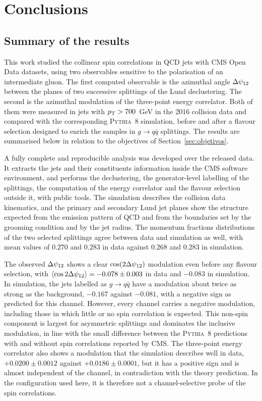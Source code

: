\chapter{Conclusions}
\label{cap:conclusoes}

\section{Summary of the results}
\label{sec:conc-summary}

This work studied the collinear spin correlations in QCD jets with CMS Open Data datasets, using 
two observables sensitive to the polarisation of an intermediate gluon. The first 
computed observable is the azimuthal angle $\Delta\psi_{12}$ between the planes of two
successive splittings of the Lund declustering. The second is the azimuthal
modulation of the three-point energy correlator. Both of them were measured 
in jets with $p_{\mathrm{T}} > 700$~GeV in the 2016 collision data and compared with the corresponding
\textsc{Pythia}~8 simulation, before and after a flavour selection designed to
enrich the samples in $g \to q\bar{q}$ splittings. The results are summarised below 
in relation to the objectives of Section~\ref{sec:objetivos}.

A fully complete and reproducible analysis was developed over the released data. It
extracts the jets and their constituents information inside the CMS software environment, and
performs the declustering, the generator-level labelling of the splittings, the
computation of the energy correlator and the flavour selection outside it, with
public tools. The simulation describes the collision data kinematics, and the primary and secondary Lund jet planes
show the structure expected from the emission pattern of QCD and from the
boundaries set by the grooming condition and by the jet radius. The momentum fractions 
distributions of the two selected splittings agree between data and simulation as well, 
with mean values of $0.270$ and $0.283$ in data
against $0.268$ and $0.283$ in simulation.

The observed $\Delta\psi_{12}$ shows a clear $\cos(2\Delta\psi_{12})$ modulation even before any flavour selection,
with $\langle \cos 2\Delta\psi_{12} \rangle = -0.078 \pm 0.003$ in data and
$-0.083$ in simulation. In simulation, the jets labelled as $g \to q\bar{q}$ have a
modulation about twice as strong as the background, $-0.167$ against $-0.081$,
with a negative sign as predicted for this channel. However, every channel carries a negative
modulation, including those in which little or no spin correlation is
expected. This non-spin component is largest for asymmetric splittings and
dominates the inclusive modulation, in line with the small difference between
the \textsc{Pythia}~8 predictions with and without spin correlations reported by
CMS. The three-point energy correlator also shows a modulation that the simulation describes
well in data, $+0.0200 \pm 0.0012$ against $+0.0186 \pm 0.0001$, but it has a positive sign 
and is almost independent of the channel, in contradiction with the theory prediction.
In the configuration used here,
it is therefore not a channel-selective probe of the spin correlations.


